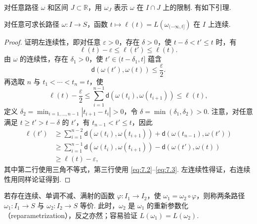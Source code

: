 对任意路径 $\omega$ 和区间 $J\subset\mathbb R$，用 $\omega_J$ 表示 $\omega$ 在 $I\cap J$ 上的限制. 有如下引理.
\begin{lemma}\label{lem:7.1}
对任意可求长路径 $\omega:I\to S$，函数 $t\mapsto\ell(t)=L(\omega_{(-\infty,t]})$ 在 $I$ 上连续.
\end{lemma}
\begin{proof}
证明左连续性，即对任意 $\varepsilon>0$，存在 $\delta>0$，使 $t-\delta<t'\le t$ 时，有
$$\ell(t)-\varepsilon\le\ell(t')\le\ell(t).$$
由 $\omega$ 的连续性，存在 $\delta_1>0$，使 $t'\in(t-\delta_1,t]$ 蕴含
\begin{equation}\label{eq:7.2}\mathsf d(\omega(t'),\omega(t))\le\frac\varepsilon2.\end{equation}
再选取 $n$ 与 $t_1<\cdots<t_n=t$，使
\begin{equation}\label{eq:7.3}
\ell(t)-\frac\varepsilon2\le\sum_{i=1}^{n-1}\mathsf d(\omega(t_i),\omega(t_{i+1}))\le\ell(t),
\end{equation}
定义 $\delta_2=\min_{i=1,\ldots,n-1}|t_{i+1}-t_i|>0$，令 $\delta=\min(\delta_1,\delta_2)>0$. 注意，对任意满足 $t\ge t'>t-\delta$ 的 $t'$，有 $t_{n-1}<t'\le t$，因此
$$\begin{aligned}
\ell(t')&\ge\sum_{i=1}^{n-2}\mathsf d(\omega(t_i),\omega(t_{i+1}))+\mathsf d(\omega(t_{n-1}),\omega(t'))\\
&\ge\sum_{i=1}^{n-1}\mathsf d(\omega(t_i),\omega(t_{i+1}))-\mathsf d(\omega(t'),\omega(t))\\
&\ge\ell(t)-\varepsilon,
\end{aligned}$$
其中第二行使用三角不等式，第三行使用 \eqref{eq:7.2}–\eqref{eq:7.3}. 左连续性得证，右连续性用同样论证得到.
\end{proof}
若存在连续、单调不减、满射的函数 $\varphi:I_1\to I_2$，使 $\omega_1=\omega_2\circ\varphi$，则称两条路径 $\omega_1:I_1\to S$ 与 $\omega_2:I_2\to S$ 等价. 此时，$\omega_2$ 是 $\omega_1$ 的重新参数化（reparametrization），反之亦然；容易验证 $L(\omega_1)=L(\omega_2)$.

